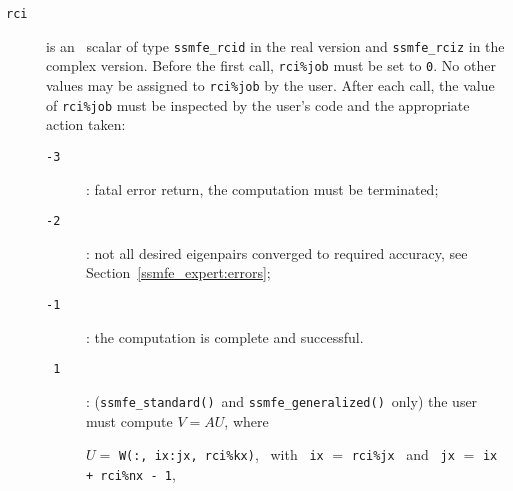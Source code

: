 \begin{description}
%
\item[\texttt{rci}] is an \intentinout\ scalar  of type
{\tt ssmfe\_rcid} in the real version and
{\tt ssmfe\_rciz} in the complex version.
Before the first call, {\tt rci\%job} must be set to {\tt 0}.
No other values may be assigned to {\tt rci\%job} by the user.
After each call,
the value of {\tt rci\%job} must be inspected by the user's code
and the appropriate action taken: 
\begin{description}
%
\item[\texttt{-3}]: fatal error return, the computation must be terminated;
%
\item[\texttt{-2}]: 
not all desired eigenpairs converged to required accuracy,
see Section~\ref{ssmfe_expert:errors}; 
%
\item[\texttt{-1}]: the computation is complete and successful.
%
\item[\texttt{~1}]:
({\tt ssmfe\_standard()}\ and {\tt ssmfe\_generalized()}\ only)
the user must compute $V = A U$, where

\hspace{8mm}
$U=$ {\tt W(:, ix:jx, rci\%kx)}, 
~with~ {\tt ix} $=$ {\tt rci\%jx} 
~and~
{\tt jx} $=$ {\tt ix + rci\%nx - 1},


\end{description}
\end{description}
